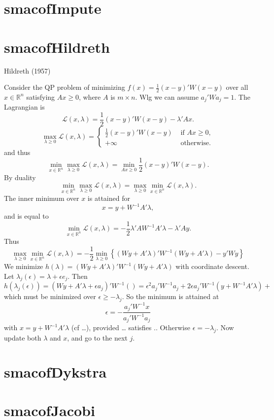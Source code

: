 \documentclass[
  12pt,
]{article}
\newcommand{\eps}{\epsilon}
\begin{document}
\section{smacofImpute}\label{smacofimpute}

\section{smacofHildreth}\label{smacofhildreth}

Hildreth (1957)

Consider the QP problem of minimizing \(f(x)=\frac12(x-y)'W(x-y)\)
over all \(x\in\mathbb{R}^n\) satisfying \(Ax\geq 0\), where \(A\) is \(m\times n\). Wlg we can assume \(a_j'Wa_j=1\). The Lagrangian is
\[
\mathcal{L}(x,\lambda)=\frac12(x-y)'W(x-y)-\lambda'Ax.
\]
\[
\max_{\lambda\geq 0}\mathcal{L}(x,\lambda)=\begin{cases}\frac12(x-y)'W(x-y)&\text{ if }Ax\geq 0,\\
+\infty&\text{ otherwise}.\end{cases}
\]
and thus
\[
\min_{x\in\mathbb{R}^n}\max_{\lambda\geq 0}\mathcal{L}(x,\lambda)=\min_{Ax\geq 0}\frac12(x-y)'W(x-y).
\]
By duality
\[
\min_{x\in\mathbb{R}^n}\max_{\lambda\geq 0}\mathcal{L}(x,\lambda)=\max_{\lambda\geq 0}\min_{x\in\mathbb{R}^n}\mathcal{L}(x,\lambda).
\]
The inner minimum over \(x\) is attained for
\[
x=y+W^{-1}A'\lambda,
\]
and is equal to
\[
\min_{x\in\mathbb{R}^n}\mathcal{L}(x,\lambda)=-\frac12\lambda'AW^{-1}A'\lambda-\lambda'Ay.
\]
Thus
\[
\max_{\lambda\geq 0}\min_{x\in\mathbb{R}^n}\mathcal{L}(x,\lambda)=
-\frac12\min_{\lambda\geq 0}\left\{(Wy+A'\lambda)'W^{-1}(Wy+A'\lambda)-y'Wy\right\}
\]
We minimize \(h(\lambda)=(Wy+A'\lambda)'W^{-1}(Wy+A'\lambda)\) with coordinate descent. Let \(\lambda_j(\eps)=\lambda+\eps e_j\). Then
\[
h(\lambda_j(\eps))=(Wy+A'\lambda+\eps a_j)'W^{-1}()=\eps^2a_j'W^{-1}a_j+2\eps a_j'W^{-1}(y+W^{-1}A'\lambda)+
\]
which must be minimized over \(\eps\geq-\lambda_j\). So the minimum is attained at
\[
\eps=-\frac{a_j'W^{-1}x}{a_j'W^{-1}a_j}
\]
with \(x=y+W^{-1}A'\lambda\) (cf \ldots), provided \ldots{} satisfies .. Otherwise \(\eps=-\lambda_j\). Now update both \(\lambda\) and \(x\),
and go to the next \(j\).

\section{smacofDykstra}\label{smacofdykstra}

\section{smacofJacobi}\label{smacofjacobi}
\end{document}
